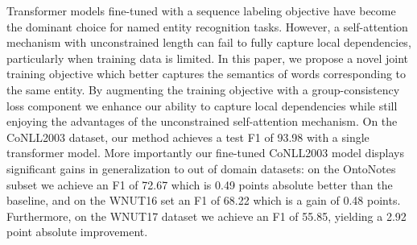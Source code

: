 Transformer models fine-tuned with a sequence labeling objective have become the dominant choice for named entity recognition tasks. However, a self-attention mechanism with unconstrained length can fail to fully capture local dependencies, particularly when training data is limited. In this paper, we propose a novel joint training objective which better captures the semantics of words corresponding to the same entity. By augmenting the training objective with a group-consistency loss component we enhance our ability to capture local dependencies while still enjoying the advantages of the unconstrained self-attention mechanism. On the CoNLL2003 dataset, our method achieves a test F1 of 93.98 with a single transformer model. More importantly our fine-tuned CoNLL2003 model displays significant gains in generalization to out of domain datasets: on the OntoNotes subset we achieve an F1 of 72.67 which is 0.49 points absolute better than the baseline, and on the WNUT16 set an F1 of 68.22 which is a gain of 0.48 points. Furthermore, on the WNUT17 dataset we achieve an F1 of 55.85, yielding a 2.92 point absolute improvement.

